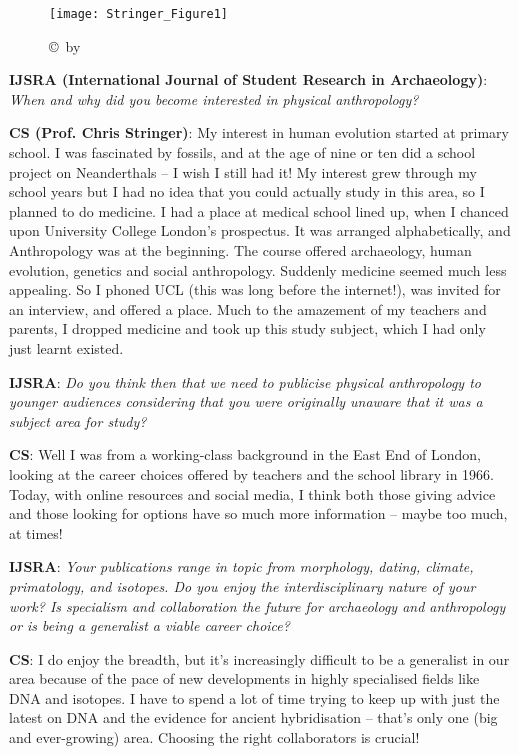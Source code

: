 \documentclass{ijsra}
\begin{document}
\IJSRAopening

\begin{figure}[!htb] %
	\centering
	\texttt{[image: Stringer\_Figure1]}
	\caption{
	{\normalfont\scriptsize \copyright\ by
                  }}
	\label{fig:Stringer_Figure1}
\end{figure}

\textbf{IJSRA (International Journal of Student Research in Archaeology)}: 
\textit{When and why did you become interested in physical anthropology?}
 
\textbf{CS (Prof. Chris Stringer)}: My interest in human evolution started at primary school.
I was fascinated by fossils, and at the age of nine or ten did a school project on Neanderthals – I wish I still had it!
My interest grew through my school years but I had no idea that you could actually study in this area, so I planned to do medicine.
I had a place at medical school lined up, when I chanced upon University College London’s prospectus.
It was arranged alphabetically, and Anthropology was at the beginning.
The course offered archaeology, human evolution, genetics and social anthropology.
Suddenly medicine seemed much less appealing.
So I phoned UCL (this was long before the internet!), was invited for an interview, and offered a place.
Much to the amazement of my teachers and parents, I dropped medicine and took up this study subject,
which I had only just learnt existed.
 
\textbf{IJSRA}: \textit{Do you think then that we need to publicise physical anthropology to younger audiences considering that you were
originally unaware that it was a subject area for study?}

\textbf{CS}: Well I was from a working-class background in the East End of London, looking at the career choices offered by
teachers and the school library in 1966. Today, with online resources and social media,
I think both those giving advice and those looking for options have so much more information – maybe too much, at times!

\textbf{IJSRA}: \textit{Your publications range in topic from morphology, dating, climate, primatology, and isotopes.
Do you enjoy the interdisciplinary nature of your work? 
Is specialism and collaboration the future for archaeology and anthropology or is being a generalist a viable career choice?}

\textbf{CS}: I do enjoy the breadth, but it’s increasingly difficult to be a generalist in our area because of
the pace of new developments in highly specialised fields like DNA and isotopes.
I have to spend a lot of time trying to keep up with just the latest on DNA and the evidence for ancient hybridisation – that’s only one (big and ever-growing) area. Choosing the right collaborators is crucial!
\end{document}
